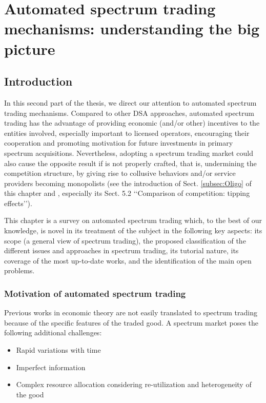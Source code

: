 \graphicspath{ {img/Survey/} }
\chapter[Automated spectrum trading mechanisms: understanding the big picture][Automated spectrum trading mechanisms]{Automated spectrum trading mechanisms: understanding the big picture}\label{Survey_chap}
\section{Introduction}\label{Survey_sec_Intro}
In this second part of the thesis, we direct our attention to automated spectrum trading mechanisms.
Compared to other DSA approaches, automated spectrum trading has the advantage of providing economic (and/or other) incentives to the entities involved, especially important to licensed operators, encouraging their cooperation and promoting motivation for future investments in primary spectrum acquisitions.
Nevertheless, adopting a spectrum trading market could also cause the opposite result if is not properly crafted, that is, undermining the competition structure, by giving rise to collusive behaviors and/or service providers becoming monopolists (see the introduction of Sect. \ref{subsec:Oligo} of this chapter and \cite{ref:Yoon2012}, especially its Sect. 5.2 ‘‘Comparison of competition: tipping effects’’).

This chapter is a survey on automated spectrum trading which, to the best of our knowledge, is novel in its treatment of the subject in the following key aspects: its scope (a general view of spectrum trading), the proposed classification of the different issues and approaches in spectrum trading, its tutorial nature, its coverage of the most up-to-date works, and the identification of the main open problems.  

\subsection{Motivation of automated spectrum trading}
Previous works in economic theory are not easily translated to spectrum trading because of the specific features of the traded good. A spectrum market poses the following additional challenges:
\begin{itemize}
\tightlist
\item{Rapid variations with time}
\item{Imperfect information}
\item{Complex resource allocation considering re-utilization and heterogeneity of the good}
\end{itemize}

